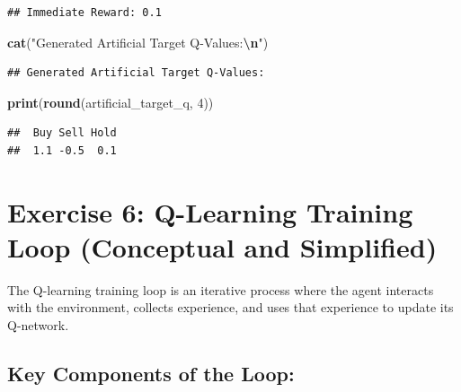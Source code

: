 \documentclass[
]{article}
\newenvironment{Shaded}{\begin{snugshade}}{\end{snugshade}}
\newcommand{\DecValTok}[1]{\textcolor[rgb]{0.00,0.00,0.81}{#1}}
\newcommand{\FunctionTok}[1]{\textcolor[rgb]{0.13,0.29,0.53}{\textbf{#1}}}
\newcommand{\NormalTok}[1]{#1}
\newcommand{\SpecialCharTok}[1]{\textcolor[rgb]{0.81,0.36,0.00}{\textbf{#1}}}
\newcommand{\StringTok}[1]{\textcolor[rgb]{0.31,0.60,0.02}{#1}}
\begin{document}
\begin{verbatim}
## Immediate Reward: 0.1
\end{verbatim}

\begin{Shaded}
\begin{Highlighting}[]
\FunctionTok{cat}\NormalTok{(}\StringTok{"Generated Artificial Target Q{-}Values:}\SpecialCharTok{\textbackslash{}n}\StringTok{"}\NormalTok{)}
\end{Highlighting}
\end{Shaded}

\begin{verbatim}
## Generated Artificial Target Q-Values:
\end{verbatim}

\begin{Shaded}
\begin{Highlighting}[]
\FunctionTok{print}\NormalTok{(}\FunctionTok{round}\NormalTok{(artificial\_target\_q, }\DecValTok{4}\NormalTok{))}
\end{Highlighting}
\end{Shaded}

\begin{verbatim}
##  Buy Sell Hold 
##  1.1 -0.5  0.1
\end{verbatim}

\hypertarget{exercise-6-q-learning-training-loop-conceptual-and-simplified}{%
\section{Exercise 6: Q-Learning Training Loop (Conceptual and
Simplified)}\label{exercise-6-q-learning-training-loop-conceptual-and-simplified}}

The Q-learning training loop is an iterative process where the agent
interacts with the environment, collects experience, and uses that
experience to update its Q-network.

\hypertarget{key-components-of-the-loop}{%
\subsection{Key Components of the
Loop:}\label{key-components-of-the-loop}}
\end{document}
